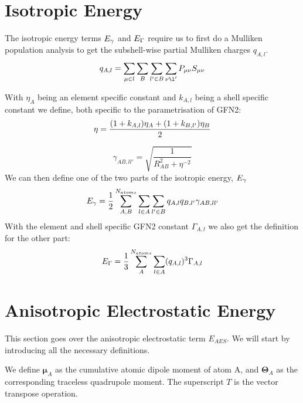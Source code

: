 \section{Isotropic Energy}
The isotropic energy terms $\E{\gamma}$ and $\E{\Gamma}$ require us to first do a Mulliken population analysis to get the subshell-wise partial Mulliken charges $q_{A,l}$.
\begin{equation}
    q_{A,l} = \sum_{\mu\in l}\sum_B\sum_{l'\in B}\sum_{\nu\l'}P_{\mu\nu}S_{\mu\nu}\\
\end{equation}

With $\eta_A$ being an element specific constant and $k_{A,l}$ being a shell specific constant we define, both specific to the parametrisation of GFN2:
\begin{equation}
    \eta = \frac{(1+k_{A,l})\eta_A+(1+k_{B,l'})\eta_B}{2}\\
\end{equation}

\begin{equation}
    \gamma_{AB,ll'} = \sqrt{\frac{1}{R_{AB}^2+\eta^{-2}}}
\end{equation}
We can then define one of the two parts of the isotropic energy, $\E{\gamma}$
\begin{equation}
    \E{\gamma} = \frac{1}{2}\sum_{A,B}^{N_{atoms}}\sum_{l\in A}\sum_{l'\in B}q_{A,l}q_{B,l'}\gamma_{AB,ll'}\label{eq:gamma}
\end{equation}
With the element and shell specific GFN2 constant $\Gamma_{A,l}$ we also get the definition for the other part:
\begin{equation}
    \E{\Gamma} = \frac{1}{3}\sum_A^{N_{atoms}}\sum_{l\in A}(q_{A,l})^3\Gamma_{A,l} \label{eq:Gamma}
\end{equation}



\section{Anisotropic Electrostatic Energy} \label{sec:AES}

This section goes over the anisotropic electrostatic term $E_{AES}$. We will start by introducing all the necessary definitions.

We define $\pmb{\mu}_A$ as the cumulative atomic dipole moment of atom A, and $\pmb{\Theta}_A$ as the corresponding traceless quadrupole moment. The superscript $T$ is the vector transpose operation.


